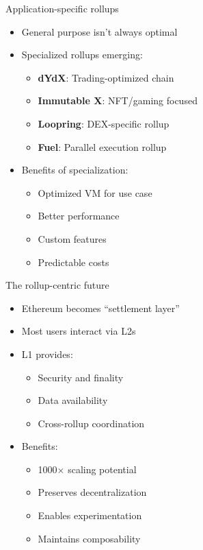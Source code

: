 \documentclass[aspectratio=169, lualatex, handout]{beamer}
\begin{document}
\begin{frame}{Application-specific rollups}
	\begin{itemize}
		\item General purpose isn't always optimal
		\item Specialized rollups emerging:
		      \begin{itemize}
			      \item \textbf{dYdX}: Trading-optimized chain
			      \item \textbf{Immutable X}: NFT/gaming focused
			      \item \textbf{Loopring}: DEX-specific rollup
			      \item \textbf{Fuel}: Parallel execution rollup
		      \end{itemize}
		\item Benefits of specialization:
		      \begin{itemize}
			      \item Optimized VM for use case
			      \item Better performance
			      \item Custom features
			      \item Predictable costs
		      \end{itemize}
	\end{itemize}
\end{frame}

\begin{frame}{The rollup-centric future}
	\begin{itemize}
		\item Ethereum becomes ``settlement layer''
		\item Most users interact via L2s
		\item L1 provides:
		      \begin{itemize}
			      \item Security and finality
			      \item Data availability
			      \item Cross-rollup coordination
		      \end{itemize}
		\item Benefits:
		      \begin{itemize}
			      \item 1000$\times$ scaling potential
			      \item Preserves decentralization
			      \item Enables experimentation
			      \item Maintains composability
		      \end{itemize}
	\end{itemize}
\end{frame}
\end{document}
